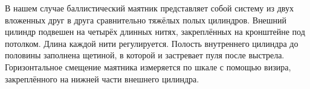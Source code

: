 В нашем случае баллистический маятник представляет собой систему из двух вложенных друг в друга сравнительно тяжёлых полых цилиндров.
Внешний цилиндр подвешен на четырёх длинных нитях,
закреплённых на кронштейне под потолком.
Длина каждой нити регулируется.
Полость внутреннего цилиндра до половины заполнена щетиной,
в которой и застревает пуля после выстрела.
Горизонтальное смещение маятника измеряется по шкале с помощью визира,
закреплённого на нижней части внешнего цилиндра.